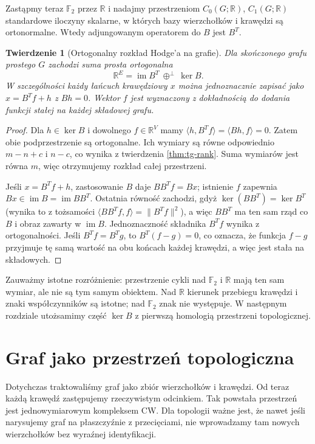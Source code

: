 \documentclass[11pt,a4paper]{report}
\numberwithin{equation}{section}
\theoremstyle{plain}
\newtheorem{twierdzenie}{Twierdzenie}[section]
\theoremstyle{definition}
\theoremstyle{remark}
\begin{document}
Zastąpmy teraz $\mathbb F_2$ przez $\mathbb R$ i nadajmy
przestrzeniom $C_0(G;\mathbb R)$, $C_1(G;\mathbb R)$
standardowe iloczyny skalarne, w których bazy wierzchołków
i krawędzi są ortonormalne. Wtedy adjungowanym operatorem
do $B$ jest $B^T$.

\begin{twierdzenie}[Ortogonalny rozkład Hodge'a na grafie]
\label{thm:tg-edge-hodge}
Dla skończonego grafu prostego $G$ zachodzi suma prosta ortogonalna
\[
\mathbb R^E=\operatorname{im}B^T\ \oplus^\perp\ \ker B.
\]
W szczególności każdy łańcuch krawędziowy $x$ można
jednoznacznie zapisać jako $x=B^Tf+h$ z $Bh=0$.
Wektor $f$ jest wyznaczony z dokładnością do dodania funkcji
stałej na każdej składowej grafu.
\end{twierdzenie}

\begin{proof}
Dla $h\in\ker B$ i dowolnego $f\in\mathbb R^V$ mamy
$\langle h,B^Tf\rangle=\langle Bh,f\rangle=0$.
Zatem obie podprzestrzenie są ortogonalne.
Ich wymiary są równe odpowiednio
$m-n+c$ i $n-c$, co wynika z twierdzenia
\ref{thm:tg-rank}. Suma wymiarów jest równa $m$,
więc otrzymujemy rozkład całej przestrzeni.

Jeśli $x=B^Tf+h$, zastosowanie $B$ daje
$BB^Tf=Bx$; istnienie $f$ zapewnia
$Bx\in\operatorname{im}B=\operatorname{im}BB^T$.
Ostatnia równość zachodzi, gdyż
$\ker(BB^T)=\ker B^T$ (wynika to z tożsamości
$\langle BB^Tf,f\rangle=\|B^Tf\|^2$), a więc
$BB^T$ ma ten sam rząd co $B$ i obraz zawarty w
$\operatorname{im}B$.
Jednoznaczność składnika $B^Tf$ wynika z ortogonalności.
Jeśli $B^Tf=B^Tg$, to $B^T(f-g)=0$, co oznacza,
że funkcja $f-g$ przyjmuje tę samą wartość na obu
końcach każdej krawędzi, a więc jest stała na składowych.
\end{proof}

Zauważmy istotne rozróżnienie: przestrzenie cykli nad
$\mathbb F_2$ i $\mathbb R$ mają ten sam wymiar,
ale nie są tym samym obiektem. Nad $\mathbb R$ kierunek
przebiegu krawędzi i znaki współczynników są istotne;
nad $\mathbb F_2$ znak nie występuje. W następnym
rozdziale utożsamimy część $\ker B$ z pierwszą homologią
przestrzeni topologicznej.

\chapter{Graf jako przestrzeń topologiczna}
\label{ch:tg-topology}

Dotychczas traktowaliśmy graf jako zbiór wierzchołków i krawędzi.
Od teraz każdą krawędź zastępujemy rzeczywistym odcinkiem.
Tak powstała przestrzeń jest jednowymiarowym kompleksem CW.
Dla topologii ważne jest, że nawet jeśli narysujemy graf
na płaszczyźnie z przecięciami, nie wprowadzamy tam
nowych wierzchołków bez wyraźnej identyfikacji.
\end{document}
